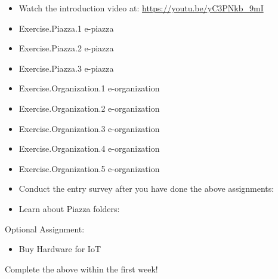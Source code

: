 \begin{itemize}
\item  Watch the introduction video at:
  \url{https://youtu.be/yC3PNkb_9mI}
\item Exercise.Piazza.1 e-piazza
\item Exercise.Piazza.2 e-piazza
\item Exercise.Piazza.3 e-piazza
\item Exercise.Organization.1 e-organization
\item Exercise.Organization.2 e-organization
\item Exercise.Organization.3 e-organization
\item Exercise.Organization.4 e-organization
\item Exercise.Organization.5 e-organization
\item 
  Conduct the entry survey after you have done the above assignments:

\item 
  Learn about Piazza folders:
\end{itemize}

Optional Assignment:

\begin{itemize}
\item Buy Hardware for IoT
\end{itemize}

Complete the above within the first week!

